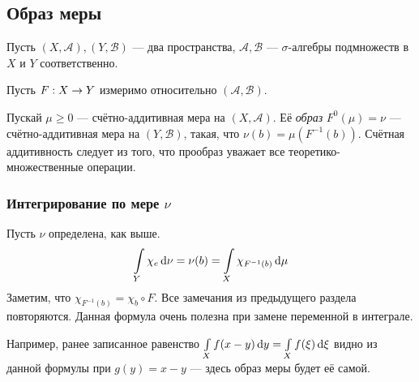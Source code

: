 \documentclass[a4paper]{report}
\begin{document}
    \subsection{Образ меры}
    Пусть $(X, \mathcal{A}), (Y, \mathcal{B})$ --- два пространства, $\mathcal{A}, \mathcal{B}$ --- $\sigma$-алгебры подмножеств в $X$ и $Y$ соответственно.

    Пусть $F: X \rightarrow Y$ измеримо относительно $(\mathcal{A}, \mathcal{B})$.

    Пускай  $\mu \ge 0$ --- счётно-аддитивная мера на $(X, \mathcal{A})$.
    Её \emph{образ} $F^0(\mu) = \nu$ --- счётно-аддитивная мера на $(Y, \mathcal{B})$, такая, что $\nu(b) = \mu(F^{-1}(b))$.
    Счётная аддитивность следует из того, что прообраз уважает все теоретико-множественные операции.

    \subsubsection{Интегрирование по мере $\nu$}
    Пусть $\nu$ определена, как выше.
    \[\int\limits_{Y}\chi_e\operatorname{d}\!\nu = \nu(b) = \int\limits_{X}\chi_{F^{-1}(b)}\operatorname{d}\!\mu\]
    Заметим, что $\chi_{F^{-1}(b)} = \chi_b \circ F$.
    Все замечания из предыдущего раздела повторяются.
    Данная формула очень полезна при замене переменной в интеграле.

    Например, ранее записанное равенство $\int\limits_{X}f(x - y)\operatorname{d}\! y = \int\limits_{X}f(\xi)\operatorname{d}\!\xi$ видно из данной формулы при $g(y) = x - y$ --- здесь образ меры будет её самой.
\end{document}
